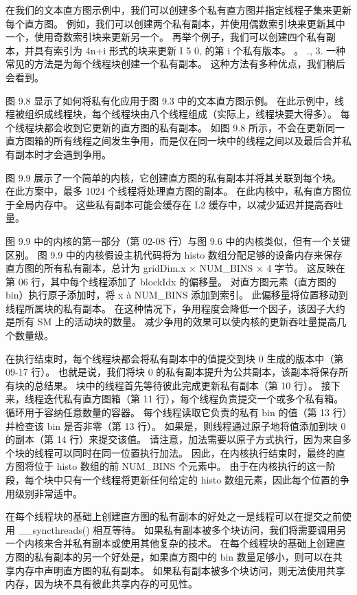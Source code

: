 在我们的文本直方图示例中，我们可以创建多个私有直方图并指定线程子集来更新每个直方图。 例如，我们可以创建两个私有副本，并使用偶数索引块来更新其中一个，使用奇数索引块来更新另一个。 再举个例子，我们可以创建四个私有副本，并具有索引为 4n+i 形式的块来更新 I 5 0, 的第 i 个私有版本。 。 ., 3. 一种常见的方法是为每个线程块创建一个私有副本。 这种方法有多种优点，我们稍后会看到。

图 9.8 显示了如何将私有化应用于图 9.3 中的文本直方图示例。 在此示例中，线程被组织成线程块，每个线程块由八个线程组成（实际上，线程块要大得多）。 每个线程块都会收到它更新的直方图的私有副本。 如图 9.8 所示，不会在更新同一直方图箱的所有线程之间发生争用，而是仅在同一块中的线程之间以及最后合并私有副本时才会遇到争用。

图 9.9 展示了一个简单的内核，它创建直方图的私有副本并将其关联到每个块。 在此方案中，最多 1024 个线程将处理直方图的副本。 在此内核中，私有直方图位于全局内存中。 这些私有副本可能会缓存在 L2 缓存中，以减少延迟并提高吞吐量。

图 9.9 中的内核的第一部分（第 02-08 行）与图 9.6 中的内核类似，但有一个关键区别。 图 9.9 中的内核假设主机代码将为 histo 数组分配足够的设备内存来保存直方图的所有私有副本，总计为 gridDim.x × NUM\_BINS × 4 字节。 这反映在第 06 行，其中每个线程添加了 blockIdx 的偏移量。 对直方图元素（直方图的 bin）执行原子添加时，将 x à NUM\_BINS 添加到索引。 此偏移量将位置移动到线程所属块的私有副本。 在这种情况下，争用程度会降低一个因子，该因子大约是所有 SM 上的活动块的数量。 减少争用的效果可以使内核的更新吞吐量提高几个数量级。

在执行结束时，每个线程块都会将私有副本中的值提交到块 0 生成的版本中（第 09-17 行）。 也就是说，我们将块 0 的私有副本提升为公共副本，该副本将保存所有块的总结果。 块中的线程首先等待彼此完成更新私有副本（第 10 行）。 接下来，线程迭代私有直方图箱（第 11 行），每个线程负责提交一个或多个私有箱。 循环用于容纳任意数量的容器。 每个线程读取它负责的私有 bin 的值（第 13 行）并检查该 bin 是否非零（第 13 行）。 如果是，则线程通过原子地将值添加到块 0 的副本（第 14 行）来提交该值。 请注意，加法需要以原子方式执行，因为来自多个块的线程可以同时在同一位置执行加法。 因此，在内核执行结束时，最终的直方图将位于 histo 数组的前 NUM\_BINS 个元素中。 由于在内核执行的这一阶段，每个块中只有一个线程将更新任何给定的 histo 数组元素，因此每个位置的争用级别非常适中。

在每个线程块的基础上创建直方图的私有副本的好处之一是线程可以在提交之前使用 \_\_syncthreads() 相互等待。 如果私有副本被多个块访问，我们将需要调用另一个内核来合并私有副本或使用其他复杂的技术。 在每个线程块的基础上创建直方图的私有副本的另一个好处是，如果直方图中的 bin 数量足够小，则可以在共享内存中声明直方图的私有副本。 如果私有副本被多个块访问，则无法使用共享内存，因为块不具有彼此共享内存的可见性。

